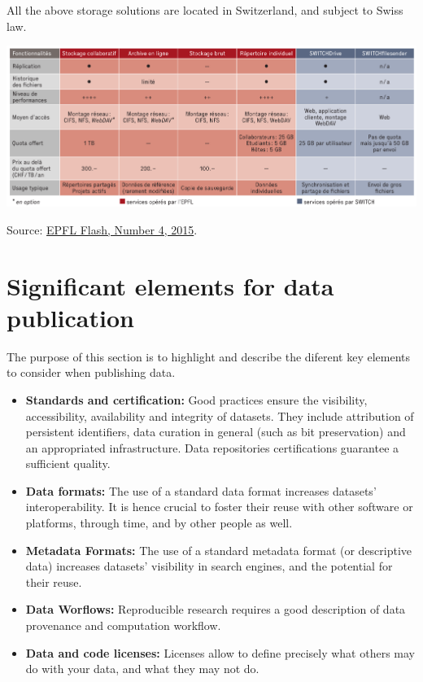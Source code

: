\noindent All the above storage solutions are located in Switzerland, and subject to Swiss law.

\includegraphics[width=1.0\textwidth]{./images/couts_stockage_flash.png}

Source: \href{http://mediacom.epfl.ch/files/content/sites/mediacom/files/Flash/Flash%2004-2015.pdf}{EPFL Flash, Number 4, 2015}.

\section{Significant elements for data publication}
\label{sigeldatpub}

The purpose of this section is to highlight and describe the diferent key elements to consider when publishing data.
\begin{itemize}
\item \textbf{Standards and certification:} Good practices ensure the visibility, accessibility, availability and integrity of datasets. They include attribution of persistent identifiers, data curation in general (such as bit preservation) and an appropriated infrastructure. Data repositories certifications guarantee a sufficient quality.
\item \textbf{Data formats:} The use of a standard data format increases datasets' interoperability. It is hence crucial to foster their reuse with other software or platforms, through time, and by other people as well.  
\item \textbf{Metadata Formats:} The use of a standard metadata format (or descriptive data) increases datasets' visibility in search engines, and the potential for their reuse.
\item \textbf{Data Worflows:} Reproducible research requires a good description of data provenance and computation workflow.
\item \textbf{Data and code licenses:} Licenses allow to define precisely what others may do with your data, and what they may not do.
\end{itemize}

